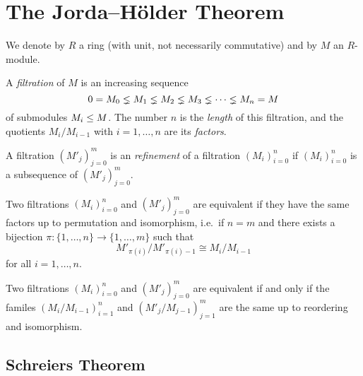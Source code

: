 \section{The Jorda--Hölder Theorem}
\label{appendix: jordan hoelder}


\begin{conventions}
  We denote by $R$ a ring (with unit, not necessarily commutative) and by $M$ an $R$-module.
\end{conventions}


\begin{definition}
  \label{definition: filtration}
  A \emph{filtration} of $M$ is an increasing sequence
  \[
                0
    =           M_0
    \lneq M_1
    \lneq M_2
    \lneq M_3
    \lneq \dotsb
    \lneq M_n
    =           M
  \]
  of submodules $M_i \leq M$.
  The number $n$ is the \emph{length} of this filtration, and the quotients $M_i/M_{i-1}$ with $i = 1, \dotsc, n$ are its \emph{factors}.
\end{definition}


\begin{definition}
  A filtration $(M'_j)_{j=0}^m$ is an \emph{refinement} of a filtration $(M_i)_{i=0}^n$ if $(M_i)_{i=0}^n$ is a subsequence of $(M'_j)_{j=0}^m$.
\end{definition}


\begin{definition}
  Two filtrations $(M_i)_{i=0}^n$ and $(M'_j)_{j=0}^m$ are equivalent if they have the same factors up to permutation and isomorphism, i.e.\ if $n = m$ and there exists a bijection $\pi \colon \{1, \dotsc, n\} \to \{1, \dotsc, m\}$ such that
  \[
          M'_{\pi(i)} / M'_{\pi(i)-1}
    \cong M_i / M_{i-1}
  \]
  for all $i = 1, \dotsc, n$.
\end{definition}


\begin{remark}
  Two filtrations $(M_i)_{i=0}^n$ and $(M'_j)_{j=0}^m$ are equivalent if and only if the familes $(M_i/M_{i-1})_{i=1}^n$ and $(M'_j/M_{j-1})_{j=1}^m$ are the same up to reordering and isomorphism.
\end{remark}







\subsection{Schreiers Theorem}



